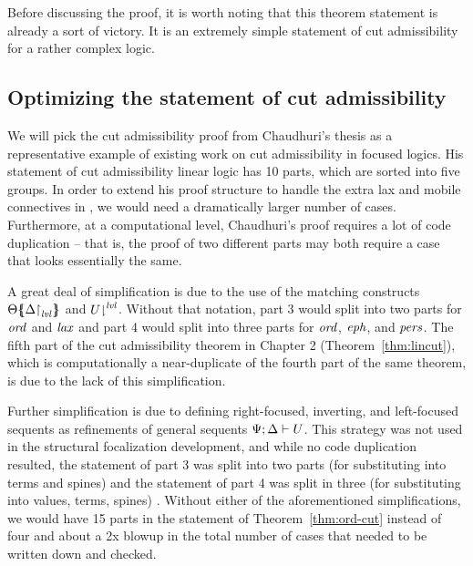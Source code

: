 Before discussing the proof, it is worth noting that this theorem
statement is already a sort of victory. It is an extremely simple
statement of cut admissibility for a rather complex logic.

\subsection{Optimizing the statement of cut admissibility}

We will pick the cut admissibility proof
from Chaudhuri's thesis \cite{chaudhuri06focused} as a representative
example of existing work on cut admissibility in focused logics.  His
statement of cut admissibility linear logic has 10 parts, 
which are sorted into
five groups. In order to extend his
proof structure to handle the extra lax and mobile connectives in
\ollll, we would need a dramatically larger number of
cases. Furthermore, at a computational level, Chaudhuri's proof
requires a lot of code duplication -- that is, the proof of two
different parts may both require a case that looks essentially the
same.

A great deal of simplification is due to the use of the matching
constructs ${\Theta}\mbox{$\{\hspace{-4pt}\{$}{\ensuremath{{\Delta}{\upharpoonright}_{{\it lvl}}}}\mbox{$\}\hspace{-4pt}\}$}$ and
${U}{\downharpoonright}^{{\it lvl}}$. Without that notation, part 3 would split
into two parts for ${\it ord}$ and ${\it lax}$ and part 4 would split into
three parts for ${\it ord}$, ${\it eph}$, and ${\it pers}$. The fifth part of
the cut admissibility theorem in Chapter 2
(Theorem~\ref{thm:lincut}), which is computationally a
near-duplicate of the fourth part of the same theorem, is due to the
lack of this simplification.

Further simplification is due to defining right-focused, inverting,
and left-focused sequents as refinements of general sequents
${\Psi};{\Delta} \vdash {U}$. This strategy was not used in the structural
focalization development, and while no code duplication resulted, the
statement of part 3 was split into two parts (for substituting into
terms and spines) and the statement of part 4 was split in three (for
substituting into values, terms, spines) \cite{simmons11structural}.
Without either of the aforementioned simplifications, we would have 15
parts in the statement of Theorem~\ref{thm:ord-cut} instead of four
and about a 2x blowup in the total number of cases that needed to be
written down and checked.

